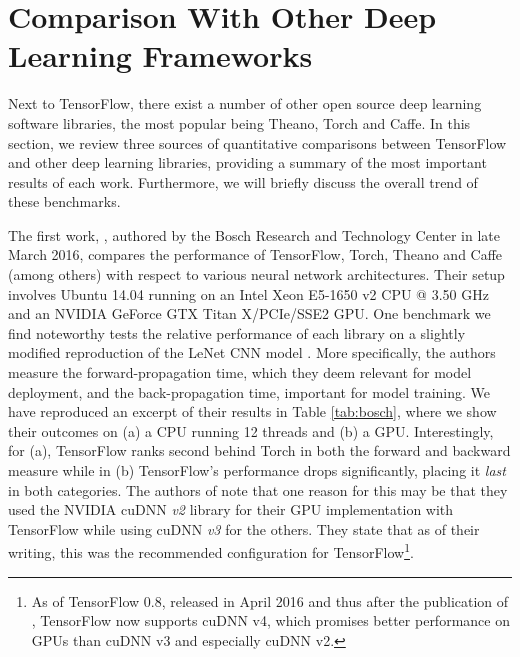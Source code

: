 \section{Comparison With Other Deep Learning Frameworks}\label{sec:comp}

Next to TensorFlow, there exist a number of other open source deep learning
software libraries, the most popular being Theano, Torch and Caffe. In this
section, we review three sources of quantitative comparisons between TensorFlow
and other deep learning libraries, providing a summary of the most important
results of each work. Furthermore, we will briefly discuss the overall trend of
these benchmarks.

The first work, \cite{bosch}, authored by the Bosch Research and Technology
Center in late March 2016, compares the performance of TensorFlow, Torch, Theano
and Caffe (among others) with respect to various neural network architectures.
Their setup involves Ubuntu 14.04 running on an Intel Xeon E5-1650 v2 CPU @ 3.50
GHz and an NVIDIA GeForce GTX Titan X/PCIe/SSE2 GPU. One benchmark we find
noteworthy tests the relative performance of each library on a slightly modified
reproduction of the LeNet CNN model \cite{lenet}. More specifically, the authors
measure the forward-propagation time, which they deem relevant for model
deployment, and the back-propagation time, important for model training. We have
reproduced an excerpt of their results in Table \ref{tab:bosch}, where we show
their outcomes on (a) a CPU running 12 threads and (b) a GPU. Interestingly, for
(a), TensorFlow ranks second behind Torch in both the forward and backward
measure while in (b) TensorFlow's performance drops significantly, placing it
\emph{last} in both categories. The authors of \cite{bosch} note that one reason
for this may be that they used the NVIDIA cuDNN \emph{v2} library for their GPU
implementation with TensorFlow while using cuDNN \emph{v3} for the others. They
state that as of their writing, this was the recommended configuration for
TensorFlow\footnote{As of TensorFlow 0.8, released in April 2016 and thus after
  the publication of \cite{bosch}, TensorFlow now supports cuDNN v4, which
  promises better performance on GPUs than cuDNN v3 and especially cuDNN v2.}.


